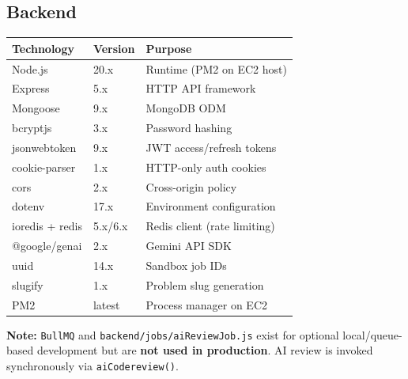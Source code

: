 \documentclass[11pt,a4paper]{article}
\begin{document}
\subsection{Backend}
\begin{table}[h]
\centering
\small
\begin{tabular}{@{}lll@{}}
\toprule
\textbf{Technology} & \textbf{Version} & \textbf{Purpose} \\
\midrule
Node.js             & 20.x   & Runtime (PM2 on EC2 host) \\
Express             & 5.x    & HTTP API framework \\
Mongoose            & 9.x    & MongoDB ODM \\
bcryptjs            & 3.x    & Password hashing \\
jsonwebtoken        & 9.x    & JWT access/refresh tokens \\
cookie-parser       & 1.x    & HTTP-only auth cookies \\
cors                & 2.x    & Cross-origin policy \\
dotenv              & 17.x   & Environment configuration \\
ioredis + redis     & 5.x/6.x& Redis client (rate limiting) \\
@google/genai       & 2.x    & Gemini API SDK \\
uuid                & 14.x   & Sandbox job IDs \\
slugify             & 1.x    & Problem slug generation \\
PM2                 & latest & Process manager on EC2 \\
\bottomrule
\end{tabular}
\end{table}

\textbf{Note:} \texttt{BullMQ} and \texttt{backend/jobs/aiReviewJob.js} exist for optional local/queue-based development but are \textbf{not used in production}. AI review is invoked synchronously via \texttt{aiCodereview()}.
\end{document}
